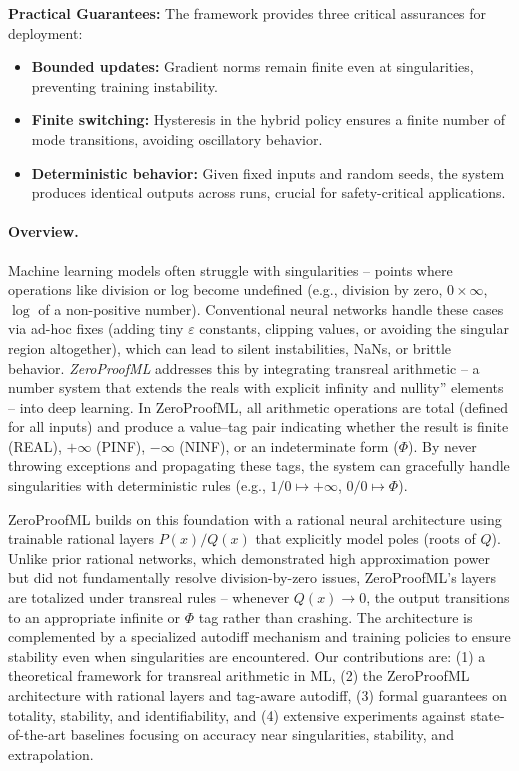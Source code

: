 \documentclass[twoside,11pt]{article}
\newcommand{\trReal}{\textsc{REAL}}
\newcommand{\trPINF}{\textsc{PINF}}
\newcommand{\trNINF}{\textsc{NINF}}
\newcommand{\trPHI}{\textsc{$\Phi$}}
\begin{document}
\textbf{Practical Guarantees:} The framework provides three critical assurances for deployment:
\begin{itemize}
\item \textbf{Bounded updates:} Gradient norms remain finite even at singularities, preventing training instability.
\item \textbf{Finite switching:} Hysteresis in the hybrid policy ensures a finite number of mode transitions, avoiding oscillatory behavior.
\item \textbf{Deterministic behavior:} Given fixed inputs and random seeds, the system produces identical outputs across runs, crucial for safety-critical applications.
\end{itemize}

\paragraph{Overview.}
Machine learning models often struggle with singularities -- points where operations like division or log become undefined (e.g., division by zero, $0 \times \infty$, $\log$ of a non-positive number). Conventional neural networks handle these cases via ad-hoc fixes (adding tiny $\varepsilon$ constants, clipping values, or avoiding the singular region altogether), which can lead to silent instabilities, NaNs, or brittle behavior. \emph{ZeroProofML} addresses this by integrating transreal arithmetic -- a number system that extends the reals with explicit infinity and nullity'' elements -- into deep learning. In ZeroProofML, all arithmetic operations are total (defined for all inputs) and produce a value--tag pair indicating whether the result is finite (\trReal), $+\infty$ (\trPINF), $-\infty$ (\trNINF), or an indeterminate form (\trPHI). By never throwing exceptions and propagating these tags, the system can gracefully handle singularities with deterministic rules (e.g., $1/0 \mapsto +\infty$, $0/0 \mapsto \Phi$).

ZeroProofML builds on this foundation with a rational neural architecture using trainable rational layers $P(x)/Q(x)$ that explicitly model poles (roots of $Q$). Unlike prior rational networks, which demonstrated high approximation power but did not fundamentally resolve division-by-zero issues, ZeroProofML's layers are totalized under transreal rules -- whenever $Q(x)\to 0$, the output transitions to an appropriate infinite or \trPHI{} tag rather than crashing. The architecture is complemented by a specialized autodiff mechanism and training policies to ensure stability even when singularities are encountered. Our contributions are: (1) a theoretical framework for transreal arithmetic in ML, (2) the ZeroProofML architecture with rational layers and tag-aware autodiff, (3) formal guarantees on totality, stability, and identifiability, and (4) extensive experiments against state-of-the-art baselines focusing on accuracy near singularities, stability, and extrapolation.
\end{document}
